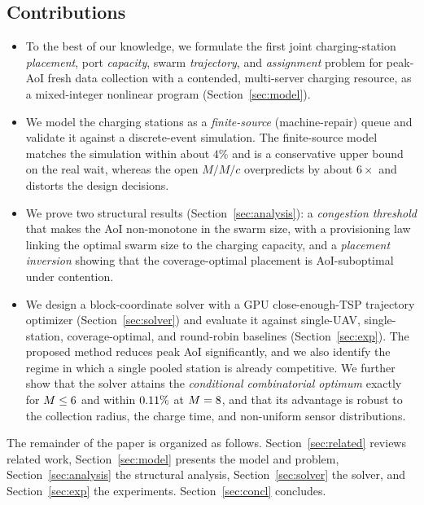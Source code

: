 \subsection{Contributions}
\begin{itemize}
\item To the best of our knowledge, we formulate the first joint charging-station \emph{placement}, port
\emph{capacity}, swarm \emph{trajectory}, and \emph{assignment} problem for
peak-AoI fresh data collection with a contended, multi-server charging resource,
as a mixed-integer nonlinear program (Section~\ref{sec:model}).
\item We model the charging stations as a \emph{finite-source} (machine-repair)
queue and validate it against a discrete-event simulation. The finite-source
model matches the simulation within about $4\%$ and is a conservative upper
bound on the real wait, whereas the open $M/M/c$ overpredicts by about $6\times$
and distorts the design decisions.
\item We prove two structural results
(Section~\ref{sec:analysis}): a \emph{congestion threshold} that makes the AoI
non-monotone in the swarm size, with a provisioning law linking the optimal
swarm size to the charging capacity, and a \emph{placement inversion} showing
that the coverage-optimal placement is AoI-suboptimal under contention.
\item We design a block-coordinate solver with a GPU close-enough-TSP trajectory
optimizer (Section~\ref{sec:solver}) and evaluate it against single-UAV,
single-station, coverage-optimal, and round-robin baselines
(Section~\ref{sec:exp}). The proposed method reduces peak AoI significantly, and
we also identify the regime in which a single pooled
station is already competitive. We further show that the solver attains the \emph{conditional combinatorial
optimum} exactly for $M\le6$ and within $0.11\%$ at
$M=8$, and that its advantage is robust
to the collection radius, the charge time, and non-uniform sensor distributions.
\end{itemize}

The remainder of the paper is organized as follows.
Section~\ref{sec:related} reviews related work,
Section~\ref{sec:model} presents the model and problem,
Section~\ref{sec:analysis} the structural analysis,
Section~\ref{sec:solver} the solver, and
Section~\ref{sec:exp} the experiments. Section~\ref{sec:concl} concludes.
